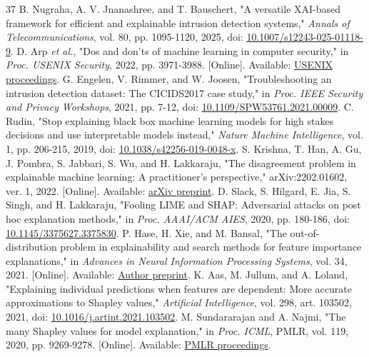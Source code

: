 \documentclass[conference,letterpaper]{IEEEtran}
\begin{document}
\begin{thebibliography}{37}
 B. Nugraha, A. V. Jnanashree, and T. Bauschert, "A versatile XAI-based framework for efficient and explainable intrusion detection systems," \emph{Annals of Telecommunications}, vol. 80, pp. 1095-1120, 2025, doi: \href{https://doi.org/10.1007/s12243-025-01118-9}{10.1007/s12243-025-01118-9}.
 D. Arp \emph{et al.}, "Dos and don'ts of machine learning in computer security," in \emph{Proc. USENIX Security}, 2022, pp. 3971-3988. [Online]. Available: \href{https://www.usenix.org/conference/usenixsecurity22/presentation/arp}{USENIX proceedings}.
 G. Engelen, V. Rimmer, and W. Joosen, "Troubleshooting an intrusion detection dataset: The CICIDS2017 case study," in \emph{Proc. IEEE Security and Privacy Workshops}, 2021, pp. 7-12, doi: \href{https://doi.org/10.1109/SPW53761.2021.00009}{10.1109/SPW53761.2021.00009}.
 C. Rudin, "Stop explaining black box machine learning models for high stakes decisions and use interpretable models instead," \emph{Nature Machine Intelligence}, vol. 1, pp. 206-215, 2019, doi: \href{https://doi.org/10.1038/s42256-019-0048-x}{10.1038/s42256-019-0048-x}.
 S. Krishna, T. Han, A. Gu, J. Pombra, S. Jabbari, S. Wu, and H. Lakkaraju, "The disagreement problem in explainable machine learning: A practitioner's perspective," arXiv:2202.01602, ver. 1, 2022. [Online]. Available: \href{https://arxiv.org/abs/2202.01602v1}{arXiv preprint}.
 D. Slack, S. Hilgard, E. Jia, S. Singh, and H. Lakkaraju, "Fooling LIME and SHAP: Adversarial attacks on post hoc explanation methods," in \emph{Proc. AAAI/ACM AIES}, 2020, pp. 180-186, doi: \href{https://doi.org/10.1145/3375627.3375830}{10.1145/3375627.3375830}.
 P. Hase, H. Xie, and M. Bansal, "The out-of-distribution problem in explainability and search methods for feature importance explanations," in \emph{Advances in Neural Information Processing Systems}, vol. 34, 2021. [Online]. Available: \href{https://arxiv.org/abs/2106.00786}{Author preprint}.
 K. Aas, M. Jullum, and A. Loland, "Explaining individual predictions when features are dependent: More accurate approximations to Shapley values," \emph{Artificial Intelligence}, vol. 298, art. 103502, 2021, doi: \href{https://doi.org/10.1016/j.artint.2021.103502}{10.1016/j.artint.2021.103502}.
 M. Sundararajan and A. Najmi, "The many Shapley values for model explanation," in \emph{Proc. ICML}, PMLR, vol. 119, 2020, pp. 9269-9278. [Online]. Available: \href{https://proceedings.mlr.press/v119/sundararajan20b.html}{PMLR proceedings}.

\end{thebibliography}
\end{document}

